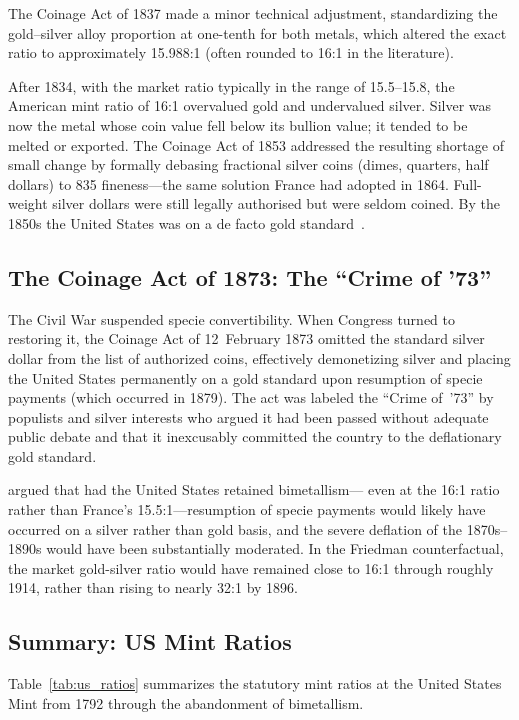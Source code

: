 \documentclass[12pt,letterpaper]{article}
\begin{document}
The Coinage Act of 1837 made a minor technical adjustment, standardizing the
gold--silver alloy proportion at one-tenth for both metals, which altered the exact
ratio to approximately 15.988:1 (often rounded to 16:1 in the literature).

After 1834, with the market ratio typically in the range of 15.5--15.8, the
American mint ratio of 16:1 overvalued gold and undervalued silver.  Silver was
now the metal whose coin value fell below its bullion value; it tended to be melted
or exported.  The Coinage Act of 1853 addressed the resulting shortage of small
change by formally debasing fractional silver coins (dimes, quarters, half dollars)
to 835\textperthousand{} fineness---the same solution France had adopted in 1864.
Full-weight silver dollars were still legally authorised but were seldom coined.
By the 1850s the United States was on a de facto gold standard~\citep{legalclarity}.

\subsection{The Coinage Act of 1873: The ``Crime of '73''}

The Civil War suspended specie convertibility.  When Congress turned to restoring
it, the Coinage Act of 12~February 1873 omitted the standard silver dollar from
the list of authorized coins, effectively demonetizing silver and placing the
United States permanently on a gold standard upon resumption of specie payments
(which occurred in 1879).  The act was labeled the ``Crime of~'73'' by populists
and silver interests who argued it had been passed without adequate public debate
and that it inexcusably committed the country to the deflationary gold standard.

\citet{friedman1990jep} argued that had the United States retained bimetallism---
even at the 16:1 ratio rather than France's 15.5:1---resumption of specie payments
would likely have occurred on a silver rather than gold basis, and the severe
deflation of the 1870s--1890s would have been substantially moderated.  In the
Friedman counterfactual, the market gold-silver ratio would have remained close to
16:1 through roughly 1914, rather than rising to nearly 32:1 by 1896.

\subsection{Summary: US Mint Ratios}

Table~\ref{tab:us_ratios} summarizes the statutory mint ratios at the United States
Mint from 1792 through the abandonment of bimetallism.
\end{document}
